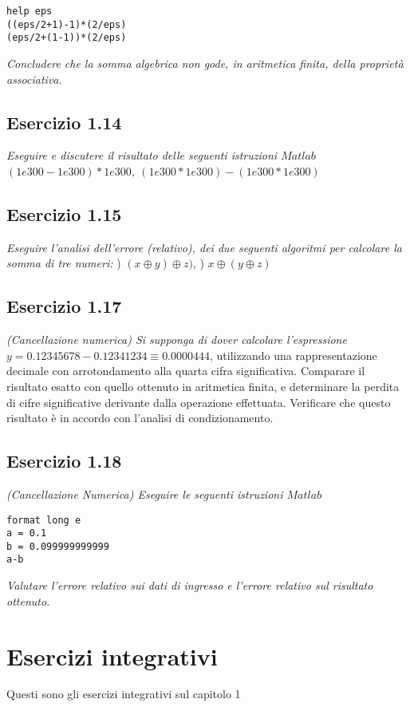 \lstset{language=Matlab}
\begin{lstlisting}
help eps
((eps/2+1)-1)*(2/eps)
(eps/2+(1-1))*(2/eps)
\end{lstlisting}
\emph{Concludere che la somma algebrica non gode, in aritmetica finita, della proprietà associativa.}

\subsection{Esercizio 1.14}
\emph{Eseguire e discutere il risultato delle seguenti istruzioni $Matlab$}
\emph{\center $(1e300-1e300)*1e300$, \qquad $(1e300*1e300)-(1e300*1e300)$}
\flushleft

\subsection{Esercizio 1.15}
\emph{Eseguire l'analisi dell'errore (relativo), dei due seguenti algoritmi per calcolare la somma di tre numeri:}
) $ (x\oplus y) \oplus z) $, ) $x\oplus(y\oplus z)$
\flushleft

\subsection{Esercizio 1.17}
\emph{(Cancellazione numerica) Si supponga di dover calcolare l'espressione }
\center $ y = 0.12345678-0.12341234 \equiv 0.0000444$,
\flushleft utilizzando una rappresentazione decimale con arrotondamento alla quarta cifra significativa. Comparare il risultato esatto con quello ottenuto in aritmetica finita, e determinare la perdita di cifre significative derivante dalla operazione effettuata. Verificare che questo risultato è in accordo con l'analisi di condizionamento.

\subsection{Esercizio 1.18}
\emph{(Cancellazione Numerica) Eseguire le seguenti istruzioni $Matlab$}

\lstset{language=Matlab}
\begin{lstlisting}
format long e
a = 0.1
b = 0.099999999999
a-b
\end{lstlisting}
\emph{Valutare l'errore relativo sui dati di ingresso e l'errore relativo sul risultato ottenuto.}

\section{Esercizi integrativi}
Questi sono gli esercizi integrativi sul capitolo 1


